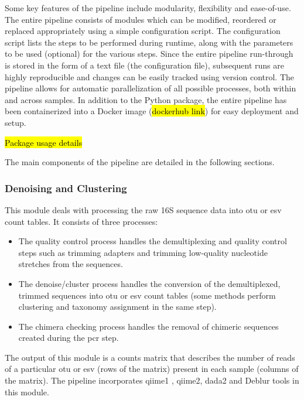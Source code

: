     Some key features of the pipeline include modularity, flexibility and ease-of-use.
    The entire pipeline consists of modules which can be modified, reordered or replaced appropriately using a simple configuration script.
    The configuration script lists the steps to be performed during runtime, along with the parameters to be used (optional) for the various steps.
    Since the entire pipeline run-through is stored in the form of a text file (the configuration file), subsequent runs are highly reproducible and changes can be easily tracked using version control.
    The pipeline allows for automatic parallelization of all possible processes, both within and across samples.
    In addition to the Python package, the entire pipeline has been containerized into a Docker \cite{Merkel1994} image (\hl{dockerhub link}) for easy deployment and setup.

    \hl{Package usage details}


    The main components of the pipeline are detailed in the following sections.

    \subsubsection*{Denoising and Clustering}
      \vspace{-5mm}
      This module deals with processing the raw 16S sequence data into \ac{otu} or \ac{esv} count tables.
      It consists of three processes:
      \begin{itemize}
        \item The quality control process handles the demultiplexing and quality control steps such as trimming adapters and trimming low-quality nucleotide stretches from the sequences.
        \item The denoise/cluster process handles the conversion of the demultiplexed, trimmed sequences into \ac{otu} or \ac{esv} count tables (some methods perform clustering and taxonomy assignment in the same step).
        \item The chimera checking process handles the removal of chimeric sequences created during the \ac{pcr} step.
      \end{itemize}
      The output of this module is a counts matrix that describes the number of reads of a particular \ac{otu} or \ac{esv} (rows of the matrix) present in each sample (columns of the matrix).
      The pipeline incorporates \ac{qiime1} \cite{Caporaso2010}, \ac{qiime2}, \ac{dada2} \cite{Callahan2016} and Deblur \cite{Amir2017} tools in this module.

